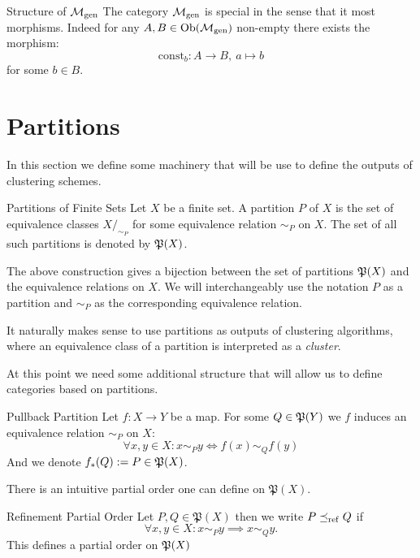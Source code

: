 \begin{myremark}{Structure of $\gen$}{}
The category $\gen$ is special in the sense that it most morphisms. Indeed for any $A,B \in \ob(\gen)$ non-empty there exists the morphism:
$$
\mathrm{const}_b: A \to B, \ a \mapsto b
$$
for some $b \in B$.
\end{myremark}


\section{Partitions}
In this section we define some machinery that will be use to define the outputs of clustering schemes.

\begin{definition}{Partitions of Finite Sets}{}
Let $X$ be a finite set. A partition $P$ of $X$ is the set of equivalence classes $X/_{\sim_P}$ for some equivalence relation $\sim_P$ on $X$.
The set of all such partitions is denoted by $\P(X)$.
\end{definition}

\begin{myremark}{}{}
The above construction gives a bijection between the set of partitions $\P(X)$ and the equivalence relations on $X$. We will interchangeably use the notation $P$ as a partition and $\sim_P$ as the corresponding equivalence relation.
\end{myremark}

It naturally makes sense to use partitions as outputs of clustering algorithms, where an equivalence class of a partition is interpreted as a \emph{cluster}.

At this point we need some additional structure that will allow us to define categories based on partitions.

\begin{definition}{Pullback Partition}{}
Let $f: X \to Y$ be a map. For some $Q \in \P(Y)$ we $f$ induces an equivalence relation $\sim_P$ on $X$:
\begin{equation*}
\forall x,y \in X: x \sim_P y \iff f(x) \sim_Q f(y)
\end{equation*}
And we denote $f_*(Q) := P \in \P(X)$.
\end{definition}

There is an intuitive partial order one can define on $\mathfrak{P}(X)$.
\begin{definition}
{Refinement Partial Order}{}
Let $P, Q \in \mathfrak{P}(X)$ then we write $P \refines Q$ if
\begin{equation*}
    \forall x,y \in X: x \sim_P y \implies x \sim_Q y.
\end{equation*}
This defines a partial order on $\P(X)$
\end{definition}

